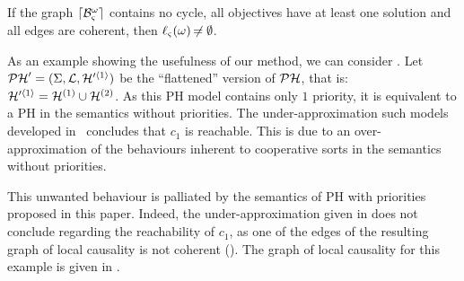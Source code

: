 \begin{theorem}
\label{th:approxinf}
  If the graph $\lceil \mathcal{B}_\varsigma^\omega\rceil$ contains no cycle,
  all objectives have at least one solution
  and all edges are coherent,
  then $\ell_\varsigma(\omega) \not\nobreak\mkern -2mu = \emptyset$.
\end{theorem}



\begin{example}
  As an example showing the usefulness of our method, we can consider .
  Let $\mathcal{PH}' = (\Sigma, \mathcal{L}, \mathcal{H}'^{\langle 1 \rangle})$ be the “flattened” version of $\mathcal{PH}$, that is: $\mathcal{H}'^{\langle 1 \rangle} = \mathcal{H}^{(1)} \cup \mathcal{H}^{(2)}$.
  As this PH model contains only $1$ priority, it is equivalent to a PH in the semantics without priorities.
  The under-approximation such models developed in~\cite{PMR12-MSCS} concludes that $c_1$ is reachable.
  This is due to an over-approximation of the behaviours inherent to cooperative sorts in the semantics without priorities.
  
  This unwanted behaviour is palliated by the semantics of PH with priorities proposed in this paper.
  Indeed, the under-approximation given in  does not conclude regarding the reachability of $c_1$,
  as one of the edges of the resulting graph of local causality is not coherent ().
  The graph of local causality for this example is given in .
\end{example}

